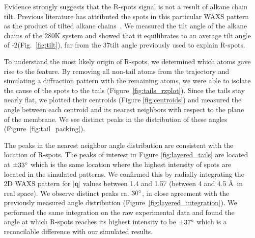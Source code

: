 \documentclass[journal=jpcbfk,manuscript=article]{achemso}
\begin{document}
  Evidence strongly suggests that the R-spots signal is not a result of alkane chain tilt. 
  Previous literature has attributed the spots in this particular WAXS pattern as the product 
  of tilted alkane chains~\cite{feng_scalable_2014}. We measured the tilt angle of the
  alkane chains of the 280K system and showed that it equilibrates to an average tilt angle of
  -2\degree (Fig.~\ref{fig:tilt}), far from the 37\degree tilt angle previously used to 
  explain R-spots. 

  To understand the most likely origin of R-spots, we determined which atoms
  gave rise to the feature. 
  By removing all non-tail atoms from the trajectory and simulating a
  diffraction pattern with the remaining atoms, we were able to isolate the cause
  of the spots to the tails (Figure~\ref{fig:tails_rzplot}). Since the tails stay
  nearly flat, we plotted their centroids (Figure \ref{fig:centroids}) and
  measured the angle between each centroid and its nearest neighbors with respect
  to the plane of the membrane. We see distinct peaks in the distribution of
  these angles (Figure~\ref{fig:tail_packing}).

  The peaks in the nearest neighbor angle distribution are consistent with the
  location of R-spots. The peaks of interest in Figure \ref{fig:layered_tails}
  are located at $\pm 33 \degree$ which is the same location where the highest
  intensity of spots are located in the simulated patterns. We confirmed this 
  by radially integrating the 2D WAXS pattern for 
  $\left|\mathbf{q}\right|$ values between 1.4 and 1.57 (between 4
  and 4.5 \AA~in real space). We observe distinct peaks ca. $30
  \degree$, in close agreement with the previously measured angle distribution
  (Figure~\ref{fig:layered_integration}). We performed the same integration on
  the raw experimental data and found the angle at which R-spots reaches its
  highest intensity to be $\pm 37 \degree$ which is a reconcilable difference
  with our simulated results.

\end{document}
